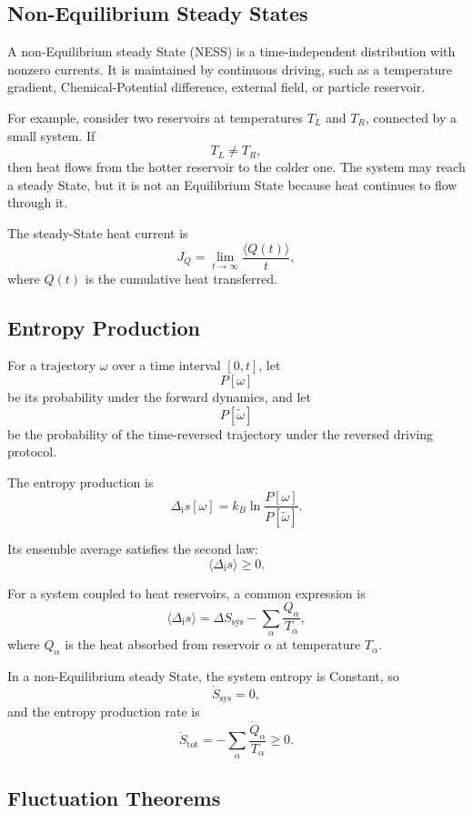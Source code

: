 \documentclass[a4paper, 10pt, onepage]{elegantbook}
\begin{document}
{\subsection{Non-Equilibrium Steady States}

A non-Equilibrium steady State (NESS) is a time-independent distribution with
nonzero currents. It is maintained by continuous driving, such as a temperature
gradient, Chemical-Potential difference, external field, or particle reservoir.

For example, consider two reservoirs at temperatures \(T_L\) and \(T_R\),
connected by a small system. If
\[
T_L\ne T_R,
\]
then heat flows from the hotter reservoir to the colder one. The system may
reach a steady State, but it is not an Equilibrium State because heat continues
to flow through it.

The steady-State heat current is
\[
J_Q
=
\lim_{t\to\infty}
\frac{\langle Q(t)\rangle}{t},
\]
where \(Q(t)\) is the cumulative heat transferred.

\subsection{Entropy Production}

For a trajectory \(\omega\) over a time interval \([0,t]\), let
\[
P[\omega]
\]
be its probability under the forward dynamics, and let
\[
P[\tilde\omega]
\]
be the probability of the time-reversed trajectory under the reversed driving
protocol.

The entropy production is
\[
\Delta_{\mathrm i}s[\omega]
=
k_B\ln
\frac{P[\omega]}{P[\tilde\omega]}.
\]

Its ensemble average satisfies the second law:
\[
\langle\Delta_{\mathrm i}s\rangle\ge0.
\]

For a system coupled to heat reservoirs, a common expression is
\[
\langle\Delta_{\mathrm i}s\rangle
=
\Delta S_{\mathrm{sys}}
-
\sum_\alpha\frac{Q_\alpha}{T_\alpha},
\]
where \(Q_\alpha\) is the heat absorbed from reservoir \(\alpha\) at
temperature \(T_\alpha\).

In a non-Equilibrium steady State, the system entropy is Constant, so
\[
\dot S_{\mathrm{sys}}=0,
\]
and the entropy production rate is
\[
\dot S_{\mathrm{tot}}
=
-\sum_\alpha\frac{\dot Q_\alpha}{T_\alpha}
\ge0.
\]

\subsection{Fluctuation Theorems}

}
\end{document}
